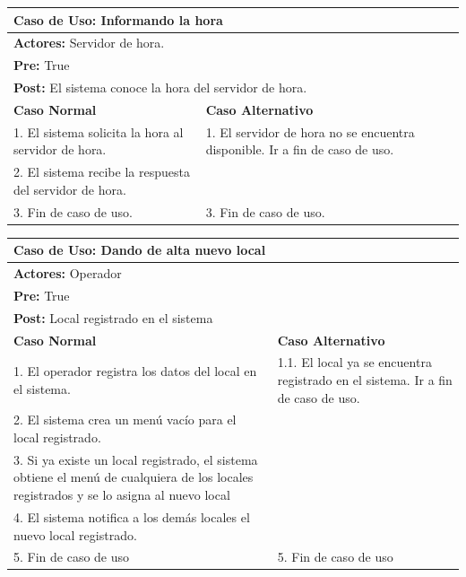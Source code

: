 \documentclass[a4paper,11pt] {article}
\begin{document}
\begin{center}
	\begin{tabular}{ | p{6.5cm} | p{6.5cm} | }
		\hline
			\multicolumn{2}{|l|}{\textbf{Caso de Uso:} Informando la hora} \\
		\hline
			\multicolumn{2}{|l|}{\textbf{Actores:} Servidor de hora.} \\
		\hline
			\multicolumn{2}{|l|}{\textbf{Pre:} True} \\
		\hline
			\multicolumn{2}{|l|}{\textbf{Post:} El sistema conoce la hora del servidor de hora.} \\
		\hline
		\textbf{Caso Normal} & \textbf{Caso Alternativo}	\\
		\hline
		1. El sistema solicita la hora al servidor de hora. & 1. El servidor de hora no se encuentra disponible. Ir a fin de caso de uso.	\\
		\hline
		2. El sistema recibe la respuesta del servidor de hora. &	\\
		\hline
		3. Fin de caso de uso. & 3. Fin de caso de uso.	\\
		\hline
	\end{tabular}
\end{center}

\begin{center}
	\begin{tabular}{ | p{6.5cm} | p{6.5cm} | }
		\hline
			\multicolumn{2}{|l|}{\textbf{Caso de Uso:} Dando de alta nuevo local} \\
		\hline
			\multicolumn{2}{|l|}{\textbf{Actores:} Operador} \\
		\hline
			\multicolumn{2}{|l|}{\textbf{Pre:} True} \\
		\hline
			\multicolumn{2}{|l|}{\textbf{Post:} Local registrado en el sistema} \\
		\hline
		\textbf{Caso Normal} & \textbf{Caso Alternativo}	\\
		\hline
		1. El operador registra los datos del local en el sistema. & 1.1. El local ya se encuentra registrado en el sistema. Ir a fin de caso de uso.	\\
		\hline
		2. El sistema crea un men\'u vac\'io para el local registrado. &	\\
		\hline
		3. Si ya existe un local registrado, el sistema obtiene el men\'u de cualquiera de los locales registrados y se lo asigna al nuevo local &	\\
		\hline
		4. El sistema notifica a los dem\'as locales el nuevo local registrado. &	\\
		\hline
		5. Fin de caso de uso &	5. Fin de caso de uso \\
		\hline
	\end{tabular}
\end{center}
\end{document}
